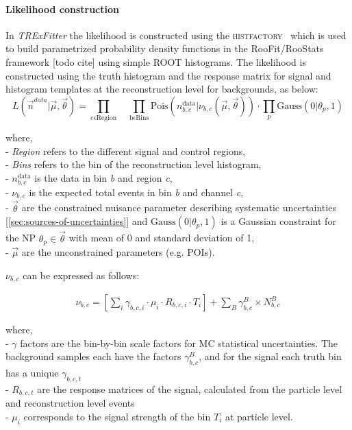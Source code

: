 \paragraph{Likelihood construction}
In \emph{TRExFitter} the likelihood is constructed using the \textsc{histfactory}~\cite{Cranmer:2012sba} which is used to build parametrized probability density functions in the RooFit/RooStats framework [todo cite] using simple ROOT histograms. The likelihood is constructed using the truth histogram and the response matrix for signal and histogram templates at the reconstruction level for backgrounds, as below:
\begin{equation}\label{eq:likelihodd-defn}
	L(\vec{n}^{data} | \vec{\mu}, \vec{\theta}) = \prod_{\mathrm{c} \epsilon \mathrm{Region}} \quad \prod_{\mathrm{b} \epsilon \mathrm{Bins}} \mathrm{Pois} (n^{\mathrm{data}}_{b,c}|\nu_{b,c}(\vec{\mu}, \Vec{\theta})) \cdot \prod_{p} \mathrm{Gauss}(0|\theta_{p},1)
\end{equation}

where,\\ 
- \textit{Region} refers to the different signal and control regions,\\
- \textit{Bins} refers to the bin of the reconstruction level histogram,\\
- $n^{\mathrm{data}}_{b,c}$ is the data in bin \textit{b} and region \textit{c}, \\
- $\nu_{b,c}$ is the expected total events in bin \textit{b} and channel \textit{c}, \\
- $\Vec{\theta}$ are the constrained nuisance parameter describing systematic uncertainties [\ref{sec:sources-of-uncertainties}] and $\mathrm{Gauss}(0|\theta_p,1)$ is a Gaussian constraint for the NP $\theta_p \in \vec{\theta}$ with mean of 0 and standard deviation of 1,\\
- $\vec{\mu}$ are the unconstrained parameters (e.g. POIs).

$\nu_{b,c}$ can be expressed as follows:

\begin{align}\label{eq:likelihodd-defn-1}
    \nu_{b,c} = \left[\sum_i \gamma_{b,c,i} \cdot \mu_{i} \cdot R_{b,c,i} \cdot T_{i}\right] + \sum_{B} \gamma_{b,c}^{B} \times N_{b,c}^{B} 
\end{align}

where, \\
- $\gamma$ factors are the bin-by-bin scale factors for MC statistical uncertainties. The background samples each have the factors $\gamma_{b,c}^{B}$, and for the signal each truth bin has a unique $\gamma_{b,c,t}$\\
- $R_{b,c,t}$ are the response matrices of the signal, calculated from the particle level and reconstruction level events \\
- $\mu_{i}$ corresponds to the signal strength of the bin $T_{i}$ at particle level.

